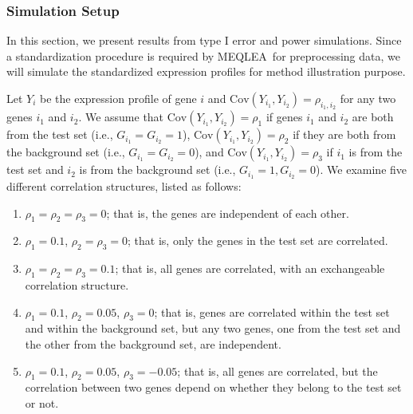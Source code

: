 \documentclass[useAMS,usenatbib, galley]{biom}
\newcommand{\OurMethod}{MEQLEA}
\newcommand{\aaCase}{a}
\newcommand{\aCase}{b}
\newcommand{\cCase}{c}
\newcommand{\eCase}{d}
\newcommand{\fCase}{e}
\begin{document}
		\subsubsection{Simulation Setup}\label{subsection:simulation}
		In this section, we present results from type I error and power simulations. Since a standardization procedure is required by \OurMethod~for preprocessing data, we will simulate the standardized expression profiles for method illustration purpose. 
		
		Let $Y_{i}$ be the expression profile of gene $i$ and $\text{Cov}(Y_{i_1}, Y_{i_2})=\rho_{i_1, i_2}$ for any two genes $i_1$ and $i_2$. We assume that $\text{Cov}(Y_{i_1}, Y_{i_2})= \rho_1$ if genes $i_1$ and $i_2$ are both from the test set (i.e., $G_{i_1} = G_{i_2}=1$),  $\text{Cov}(Y_{i_1}, Y_{i_2}) =\rho_2$ if they are both from the background set (i.e., $G_{i_1} = G_{i_2}=0$), and  $\text{Cov}(Y_{i_1}, Y_{i_2})= \rho_3$ if $i_1$ is from the test set and $i_2$ is from the background set (i.e., $G_{i_1} =1,  G_{i_2}=0$). We examine five different correlation structures, listed as follows:
		
		\begin{enumerate}
			\item[(\aaCase):] $\rho_1 = \rho_2 = \rho_3 = 0$; that is, the genes are independent of each other.
			\item[(\aCase):] $\rho_1 = 0.1$, $\rho_2 = \rho_3 = 0$; that is, only the genes in the test set are correlated.
			\item[(\cCase):] $\rho_1 = \rho_2 = \rho_3 = 0.1$; that is, all genes are correlated, with an exchangeable correlation structure. 
			\item[(\eCase):] $\rho_1 = 0.1$, $\rho_2 = 0.05$, $\rho_3 = 0$; that is, 
			genes are correlated within the test set and within the background set, but any two genes, one from the test set and the other from the background set, are independent.
			\item[(\fCase):] $\rho_1 = 0.1$, $\rho_2 = 0.05$, $\rho_3 = -0.05$; that is, all genes are correlated, but the correlation between two genes depend on whether they belong to the test set or not.
		\end{enumerate}
		
\end{document}
